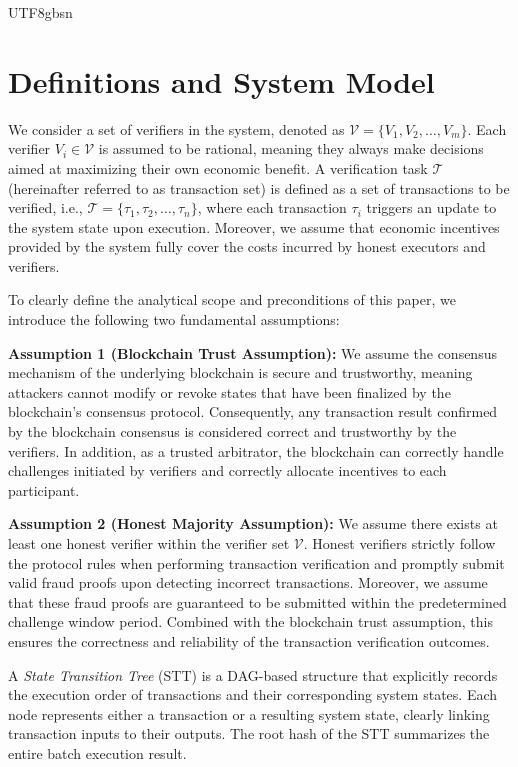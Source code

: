 \documentclass[runningheads]{llncs}
\begin{document}
\begin{CJK*}{UTF8}{gbsn}
\section{Definitions and System Model}

We consider a set of verifiers in the system, denoted as $\mathcal{V} = \{V_1, V_2, \dots, V_m\}$. Each verifier $V_i \in \mathcal{V}$ is assumed to be rational, meaning they always make decisions aimed at maximizing their own economic benefit. A verification task $\mathcal{T}$ (hereinafter referred to as transaction set) is defined as a set of transactions to be verified, i.e., $\mathcal{T} = \{\tau_1, \tau_2, \dots, \tau_n\}$, where each transaction $\tau_i$ triggers an update to the system state upon execution. Moreover, we assume that economic incentives provided by the system fully cover the costs incurred by honest executors and verifiers.

To clearly define the analytical scope and preconditions of this paper, we introduce the following two fundamental assumptions:

\textbf{Assumption 1 (Blockchain Trust Assumption):} 
We assume the consensus mechanism of the underlying blockchain is secure and trustworthy, meaning attackers cannot modify or revoke states that have been finalized by the blockchain's consensus protocol. Consequently, any transaction result confirmed by the blockchain consensus is considered correct and trustworthy by the verifiers. In addition, as a trusted arbitrator, the blockchain can correctly handle challenges initiated by verifiers and correctly allocate incentives to each participant.


\textbf{Assumption 2 (Honest Majority Assumption):} 
We assume there exists at least one honest verifier within the verifier set $\mathcal{V}$. Honest verifiers strictly follow the protocol rules when performing transaction verification and promptly submit valid fraud proofs upon detecting incorrect transactions. Moreover, we assume that these fraud proofs are guaranteed to be submitted within the predetermined challenge window period. Combined with the blockchain trust assumption, this ensures the correctness and reliability of the transaction verification outcomes.


\begin{definition}
A \textit{State Transition Tree} (STT) is a DAG-based structure that explicitly records the execution order of transactions and their corresponding system states. Each node represents either a transaction or a resulting system state, clearly linking transaction inputs to their outputs. The root hash of the STT summarizes the entire batch execution result.
\end{definition}


\end{CJK*}
\end{document}
